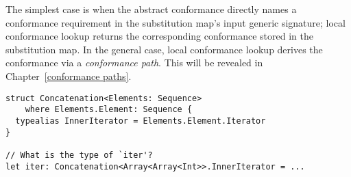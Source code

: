 \documentclass[a4paper,headsepline,bibliography=totoc,toc=flat,fleqn,twoside=semi]{scrbook}
\theoremstyle{definition}
\theoremstyle{definition}
\theoremstyle{definition}
\begin{document}
The simplest case is when the abstract conformance directly names a conformance requirement in the substitution map's input generic signature; local conformance lookup returns the corresponding conformance stored in the substitution map. In the general case, local conformance lookup derives the conformance via a \emph{conformance path}. This will be revealed in Chapter~\ref{conformance paths}.

\begin{listing}\label{dmt subst map listing}
\begin{Verbatim}
struct Concatenation<Elements: Sequence>
    where Elements.Element: Sequence {
  typealias InnerIterator = Elements.Element.Iterator
}

// What is the type of `iter'?
let iter: Concatenation<Array<Array<Int>>.InnerIterator = ...
\end{Verbatim}
\end{listing}
\eject
\end{document}
